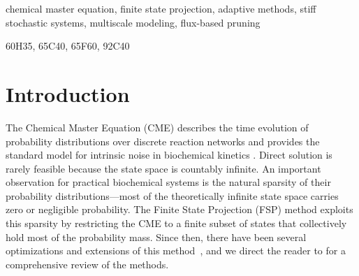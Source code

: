 \documentclass[review,onefignum,onetabnum]{siamart171218}
\begin{document}
\maketitle

\begin{abstract}
This paper introduces an adaptive Finite State Projection (FSP) algorithm for numerical simulation of the Chemical Master Equation (CME) over discrete state spaces. The proposed methodology focuses on multiscale/stiff systems; specifically systems that operate with vastly varying reaction rates over long time periods. Systems with stiff properties require careful management of time-stepping and state space control in the context of adaptive FSP methods. The proposed method uses the system's instantaneous flux as a proxy measure for determining the relevant states for truncation as well as the magnitude of time stepping. We demonstrate that the proposed methodology identifies important states that are critical for maintaining system connectivity and the adaptive time stepping accounts for adjusting the timestep for stiff and transient phases of the simulation.
\end{abstract}



\begin{keywords}
  chemical master equation, finite state projection, adaptive methods, stiff stochastic systems, multiscale modeling, flux-based pruning
\end{keywords}

\begin{AMS}
  60H35, 65C40, 65F60, 92C40
\end{AMS}

\section{Introduction}

The Chemical Master Equation (CME) describes the time evolution of probability distributions over discrete reaction networks and provides the standard model for intrinsic noise in biochemical kinetics \cite{Gillespie1977, Wilkinson2006-so}. Direct solution is rarely feasible because the state space is countably infinite. An important observation for practical biochemical systems is the natural sparsity of their probability distributions—most of the theoretically infinite state space carries zero or negligible probability. The Finite State Projection (FSP) method \cite{Munsky2006} exploits this sparsity by restricting the CME to a finite subset of states that collectively hold most of the probability mass. Since then, there have been several optimizations and extensions of this method~\cite{Kazeev2014, Vo2017, Dinh_2020,Sunkara2012, Jahnke2010, Burrage2006AKF, Sidje2015}, and we direct the reader to \cite{Dinh2016} for a comprehensive review of the methods. 
\end{document}
